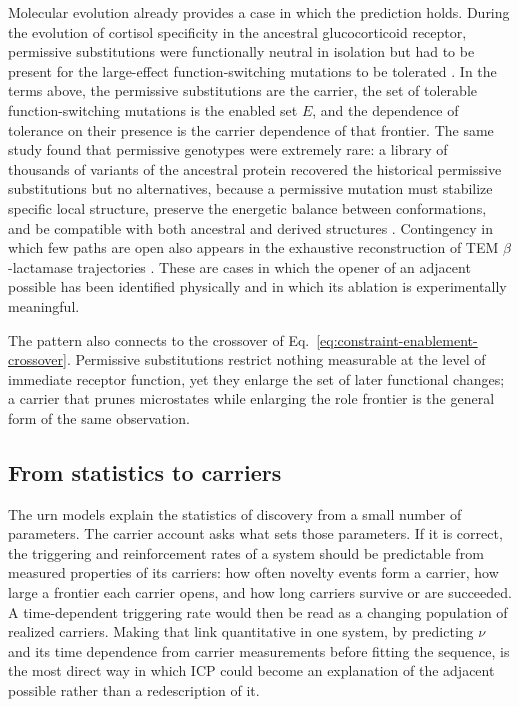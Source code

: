 Molecular evolution already provides a case in which the prediction holds.
During the evolution of cortisol specificity in the ancestral glucocorticoid
receptor, permissive substitutions were functionally neutral in isolation but
had to be present for the large-effect function-switching mutations to be
tolerated \citep{HarmsThornton2014Contingency}. In the terms above, the
permissive substitutions are the carrier, the set of tolerable
function-switching mutations is the enabled set $E$, and the dependence of
tolerance on their presence is the carrier dependence of that frontier. The
same study found that permissive genotypes were extremely rare: a library of
thousands of variants of the ancestral protein recovered the historical
permissive substitutions but no alternatives, because a permissive mutation
must stabilize specific local structure, preserve the energetic balance between
conformations, and be compatible with both ancestral and derived structures
\citep{HarmsThornton2014Contingency}. Contingency in which few paths are open
also appears in the exhaustive reconstruction of TEM $\beta$-lactamase
trajectories \citep{WeinreichEtAl2006MutationalPaths}. These are cases in which
the opener of an adjacent possible has been identified physically and in which
its ablation is experimentally meaningful.

The pattern also connects to the crossover of
Eq.~\eqref{eq:constraint-enablement-crossover}. Permissive substitutions
restrict nothing measurable at the level of immediate receptor function, yet
they enlarge the set of later functional changes; a carrier that prunes
microstates while enlarging the role frontier is the general form of the same
observation.

\subsection{From statistics to carriers}

The urn models explain the statistics of discovery from a small number of
parameters. The carrier account asks what sets those parameters. If it is
correct, the triggering and reinforcement rates of a system should be
predictable from measured properties of its carriers: how often novelty events
form a carrier, how large a frontier each carrier opens, and how long carriers
survive or are succeeded. A time-dependent triggering rate
\citep{BellinaEtAl2025TimeDependentUrn} would then be read as a changing
population of realized carriers. Making that link quantitative in one system,
by predicting $\nu$ and its time dependence from carrier measurements before
fitting the sequence, is the most direct way in which ICP could become an
explanation of the adjacent possible rather than a redescription of it.
